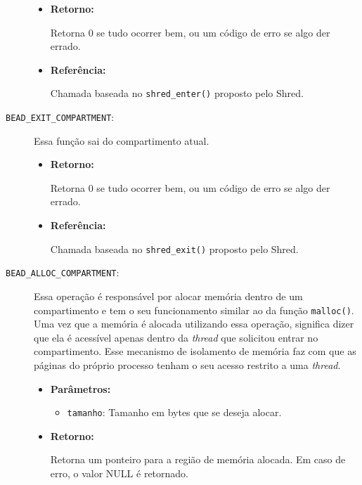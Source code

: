 \begin{description}
  \begin{itemize}
    \item \textbf{Retorno:}

Retorna 0 se tudo ocorrer bem, ou um código de erro se algo der errado.

    \item \textbf{Referência:}

Chamada baseada no \texttt{shred\_enter()} proposto pelo Shred.

\end{itemize}

  \item [\texttt{BEAD\_EXIT\_COMPARTMENT}:]

Essa função sai do compartimento atual.

  \begin{itemize}

    \item \textbf{Retorno:}

Retorna 0 se tudo ocorrer bem, ou um código de erro se algo der errado.

    \item \textbf{Referência:}

Chamada baseada no \texttt{shred\_exit()} proposto pelo Shred.

	\end{itemize}

  \item [\texttt{BEAD\_ALLOC\_COMPARTMENT}:]

Essa operação é responsável por alocar memória dentro de um compartimento e tem
o seu funcionamento similar ao da função \texttt{malloc()}. Uma vez que a
memória é alocada utilizando essa operação, significa dizer que ela é acessível
apenas dentro da \emph{thread} que solicitou entrar no compartimento. Esse mecanismo
de isolamento de memória faz com que as páginas do próprio processo tenham o
seu acesso restrito a uma \emph{thread}.

  \begin{itemize}
    \item \textbf{Parâmetros:}

    \begin{itemize}
      \item \texttt{tamanho}: Tamanho em bytes que se deseja alocar.
    \end{itemize}

    \item \textbf{Retorno:}

Retorna um ponteiro para a região de memória alocada. Em caso de erro, o valor
NULL é retornado.


\end{itemize}
\end{description}
